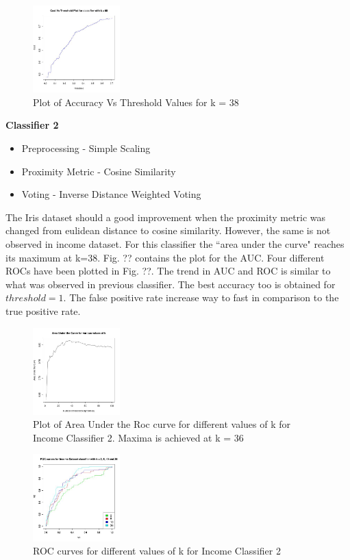 	\begin{figure}
		\label{fig:classifier1_accuracy}
		\caption{Plot of Accuracy Vs Threshold Values for k = 38}
		\centering
		\includegraphics[width=0.3\textwidth]{images/income_classifier1/accuracy.jpg}
	\end{figure}	
	
\textbf{Classifier 2}
	\begin{itemize}
		\item Preprocessing - Simple Scaling
		\item Proximity Metric - Cosine Similarity
		\item Voting - Inverse Distance Weighted Voting
	\end{itemize}
	The Iris dataset should a good improvement when the proximity metric was changed from eulidean distance to cosine similarity. However, the same is not observed in income dataset. For this classifier the ``area under the curve" reaches its maximum at k=38. Fig. ?? contains the plot for the AUC. Four different ROCs have been plotted in Fig. ??. The trend in AUC and ROC is similar to what was observed in previous classifier. The best accuracy too is obtained for $threshold=1$. The false positive rate increase way to fast in comparison to the true positive rate.\\
	\begin{figure}[h]
		\label{fig:classifier2_auc}
		\caption{Plot of Area Under the Roc curve for different values of k for Income Classifier 2. Maxima is achieved at k = 36}
		\centering
		\includegraphics[width=0.3\textwidth]{images/income_classifier2/auc.jpg}
	\end{figure}	
	\begin{figure}
		\label{fig:classifier2_roc}
		\caption{ROC curves for different values of k for Income Classifier 2}
		\centering
		\includegraphics[width=0.3\textwidth]{images/income_classifier2/roc.jpg}
	\end{figure}
